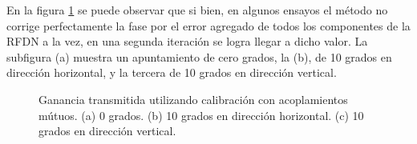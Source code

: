 En la figura \ref{fig:compErrMutual} se puede observar que si bien, en algunos ensayos el método no corrige 
perfectamente la fase por el error agregado de todos los componentes de la RFDN a la vez, en una segunda iteración se logra 
llegar a dicho valor. La subfigura (a) muestra un apuntamiento de cero grados, la (b), de 10 grados en 
dirección horizontal, y la tercera de 10 grados en dirección vertical.
\begin{figure}[H]
	\centering
 	
		\caption{Ganancia transmitida utilizando calibración con acoplamientos mútuos. (a) 0 grados. (b) 10 grados en 
		dirección horizontal. (c) 10 grados en dirección vertical.}
	\label{fig:compErrMutual}
\end{figure}
